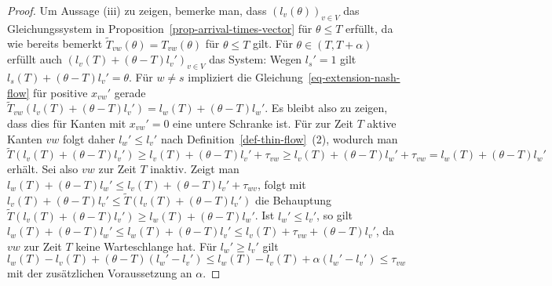 \begin{proof}
	Um Aussage (iii) zu zeigen, bemerke man, dass $(l_v(\theta))_{v\in V}$ das Gleichungssystem in Proposition~\ref{prop-arrival-times-vector} für $\theta \leq T$ erfüllt, da wie bereits bemerkt $\tilde{T}_{vw}(\theta) = T_{vw}(\theta)$ für $\theta\leq T$ gilt.
	Für $\theta \in (T, T+\alpha)$ erfüllt auch $(l_v(T) + (\theta - T)l_v')_{v\in V}$ das System:
	Wegen $l_s' = 1$ gilt $l_s(T) + (\theta - T)l_v' = \theta$.
	Für $w\neq s$ impliziert die Gleichung~\ref{eq-extension-nash-flow} für positive $x_{vw}'$ gerade $\tilde{T}_{vw}(l_v(T) + (\theta-T)l_v') = l_w(T) + (\theta - T) l_w'$.
	Es bleibt also zu zeigen, dass dies für Kanten mit $x_{vw}' = 0$ eine untere Schranke ist.
	Für zur Zeit $T$ aktive Kanten $vw$ folgt daher $l_w'\leq l_v'$ nach Definition~\ref{def-thin-flow}~(2), wodurch man $\tilde{T}(l_v(T) + (\theta - T)l_v')\geq l_v(T) + (\theta - T)l_v' + \tau_{vw}\geq l_v(T) + (\theta - T)l_w' + \tau_{vw} = l_w(T) + (\theta-T)l_w'$ erhält.
	Sei also $vw$ zur Zeit $T$ inaktiv.
	Zeigt man $l_w(T) + (\theta - T)l_w' \leq l_v(T) + (\theta - T)l_v' + \tau_{wv}$, folgt mit $l_v(T) + (\theta - T)l_v' \leq \tilde{T}(l_v(T) + (\theta - T)l_v')$ die Behauptung
	$\tilde{T}(l_v(T) + (\theta - T) l_v') \geq l_w(T) + (\theta - T)l_w'$.
	Ist $l_w' \leq l_v'$, so gilt $l_w(T) +(\theta - T)l_w' \leq l_w(T) + (\theta - T)l_v' \leq l_v(T) + \tau_{vw} + (\theta - T)l_v'$, da $vw$ zur Zeit $T$ keine Warteschlange hat.
	Für $l_w' \geq l_v'$ gilt $l_w(T) - l_v(T) + (\theta - T) (l_w' - l_v') \leq l_w(T) - l_v(T) + \alpha (l_w' - l_v') \leq \tau_{vw}$ mit der zusätzlichen Voraussetzung an $\alpha$.
\end{proof}